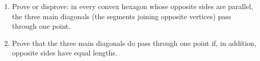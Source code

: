 \begin{enumerate}
\item[(a)] Prove or disprove: in every convex hexagon whose opposite sides are parallel, the three main diagonals (the segments joining opposite vertices) pass through one point.
\item[(b)] Prove that the three main diagonals do pass through one point if, in addition, opposite sides have equal lengths.
\end{enumerate}
